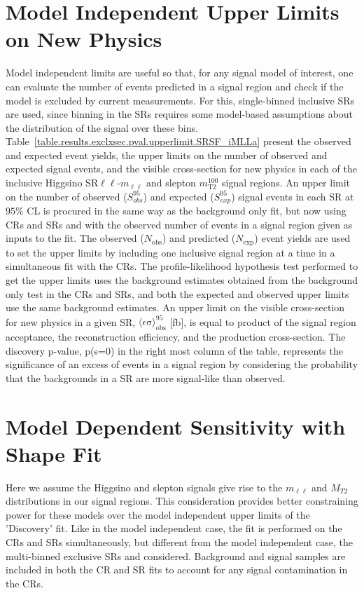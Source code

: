 \section{Model Independent Upper Limits on New Physics}
 {\renewcommand{\arraystretch}{1.3}

Model independent limits are useful so that, for any signal model of interest, one can evaluate the number of events predicted in a signal region and check if the model is excluded by current measurements.  For this, single-binned inclusive SRs are used, since binning in the SRs requires some model-based assumptions about the distribution of the signal over these bins.  Table~\ref{table.results.exclxsec.pval.upperlimit.SRSF_iMLLa} present the observed and expected event yields, the upper limits on the number of observed and expected signal events, and the visible cross-section for new physics in each of the inclusive Higgsino SR$\ell\ell$-$m_{\ell\ell}$ and slepton $m_\text{T2}^{100}$ signal regions.  An upper limit on the number of observed ($S^{95}_{obs}$) and expected ($S^{95}_{exp}$) signal events in each SR at $95\%$ CL is procured in the same way as the background only fit, but now using CRs and SRs and with the observed number of events in a signal region given as inputs to the fit.  The observed ($N_{\mathrm{obs}}$) and predicted ($N_{\mathrm{exp}}$) event yields are used to set the upper limits by including one inclusive signal region at a time in a simultaneous fit with the CRs.  The profile-likelihood hypothesis test performed to get the upper limits uses the background estimates obtained from the background only test in the CRs and SRs, and both the expected and observed upper limits use the same background estimates.  
An upper limit on the visible cross-section for new physics in a given SR, $\langle\epsilon\mathrm{\sigma}\rangle_\text{obs}^{95}$ [fb], is equal to product of the signal region acceptance, the reconstruction efficiency, and the production cross-section.  The discovery p-value, p(s=0) in the right most column of the table, represents the significance of an excess of events in a signal region by considering the probability that the backgrounds in a SR are more signal-like than observed. 

\section{Model Dependent Sensitivity with Shape Fit}
{\renewcommand{\arraystretch}{1.3}

Here we assume the Higgsino and slepton signals give rise to the $m_{\ell\ell}$ and $M_{T2}$ distributions in our signal regions.  This consideration provides better constraining power for these models over the model independent upper limits of the 'Discovery' fit.  Like in the model independent case, the fit is performed on the CRs and SRs simultaneously, but different from the model independent case, the multi-binned exclusive SRs and considered.  Background and signal samples are included in both the CR and SR fits to account for any signal contamination in the CRs.  

}}
